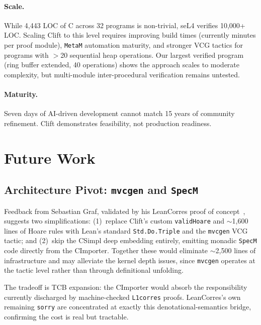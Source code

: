 \documentclass[sigconf,nonacm,screen]{acmart}
\begin{document}
\paragraph{Scale.} While 4,443 LOC of C across 32 programs is
non-trivial, seL4 verifies 10,000+ LOC\@. Scaling Clift to this
level requires improving build times (currently minutes per proof
module), \texttt{MetaM} automation maturity, and stronger VCG tactics for
programs with $>$20 sequential heap operations. Our largest
verified program (ring buffer extended, 40 operations) shows the
approach scales to moderate complexity, but multi-module
inter-procedural verification remains untested.

\paragraph{Maturity.} Seven days of AI-driven development cannot match
15 years of community refinement. Clift demonstrates feasibility, not
production readiness.

\section{Future Work}

\subsection{Architecture Pivot: \texttt{mvcgen} and \texttt{SpecM}}

Feedback from Sebastian Graf, validated by his LeanCorres
proof of concept~\cite{leancorres2026}, suggests two simplifications:
(1)~replace Clift's custom \texttt{validHoare} and $\sim$1,600 lines
of Hoare rules with Lean's standard \texttt{Std.Do.Triple} and the
\texttt{mvcgen} VCG tactic; and (2)~skip the CSimpl deep embedding
entirely, emitting monadic \texttt{SpecM} code directly from the
CImporter.  Together these would eliminate $\sim$2,500 lines of
infrastructure and may alleviate the kernel depth issues, since
\texttt{mvcgen} operates at the tactic level rather than through
definitional unfolding.

The tradeoff is TCB expansion: the CImporter would absorb the
responsibility currently discharged by machine-checked
\texttt{L1corres} proofs.  LeanCorres's own remaining \texttt{sorry}
are concentrated at exactly this denotational-semantics bridge,
confirming the cost is real but tractable.
\end{document}
